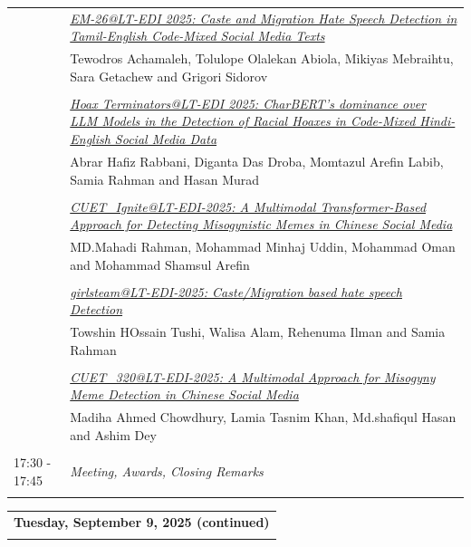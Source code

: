 \documentclass[11pt,oneside]{book}
\begin{document}
\begin{tabular}{p{24mm}p{124mm}}
                      & \hyperlink{page.152}{\emph{EM-26@LT-EDI 2025: Caste and Migration Hate Speech Detection in Tamil-English Code-Mixed Social Media Texts}}\\
        & Tewodros Achamaleh\index{Achamaleh}, Tolulope Olalekan Abiola\index{Abiola}, Mikiyas Mebraihtu\index{Mebraihtu}, Sara Getachew\index{Getachew} and Grigori Sidorov\index{Sidorov}\\\\
                
                      & \hyperlink{page.159}{\emph{Hoax Terminators@LT-EDI 2025: CharBERT's dominance over LLM Models in the Detection of Racial Hoaxes in Code-Mixed Hindi-English Social Media Data}}\\
        & Abrar Hafiz Rabbani\index{Rabbani}, Diganta Das Droba\index{Droba}, Momtazul Arefin Labib\index{Labib}, Samia Rahman\index{Rahman} and Hasan Murad\index{Murad}\\\\
                
                      & \hyperlink{page.171}{\emph{CUET\_Ignite@LT-EDI-2025: A Multimodal Transformer-Based Approach for Detecting Misogynistic Memes in Chinese Social Media}}\\
        & MD.Mahadi Rahman\index{Rahman}, Mohammad Minhaj Uddin\index{Uddin}, Mohammad Oman\index{Oman} and Mohammad Shamsul Arefin\index{Arefin}\\\\
                
                      & \hyperlink{page.177}{\emph{girlsteam@LT-EDI-2025: Caste/Migration based hate speech Detection}}\\
        & Towshin HOssain Tushi\index{Tushi}, Walisa Alam\index{Alam}, Rehenuma Ilman\index{Ilman} and Samia Rahman\index{Rahman}\\\\
                
                      & \hyperlink{page.183}{\emph{CUET\_320@LT-EDI-2025: A Multimodal Approach for Misogyny Meme Detection in Chinese Social Media}}\\
        & Madiha Ahmed Chowdhury\index{Chowdhury}, Lamia Tasnim Khan\index{Khan}, Md.shafiqul Hasan\index{Hasan} and Ashim Dey\index{Dey}\\\\
                      17:30 - 17:45 & \emph{Meeting, Awards, Closing Remarks}\\\\
      
              \end{tabular}
          \newpage
              \begin{tabular}{p{24mm}p{124mm}}
    \multicolumn{2}{l}{\bf Tuesday, September 9, 2025 (continued)} \\\\
        \end{tabular}
\end{document}
